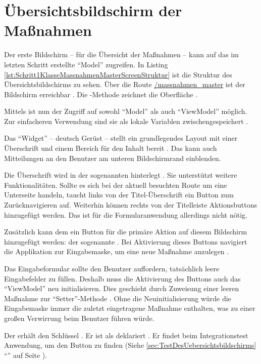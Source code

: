 \ifodd\value{page}\hbox{}\newpage\fi
\section{Übersichtsbildschirm der Maßnahmen}

Der erste Bildschirm -- für die Übersicht der Maßnahmen -- kann auf das im letzten Schritt erstellte \enquote{Model} zugreifen.
In Listing \ref{lst:Schritt1KlasseMassnahmenMasterScreenStruktur}  ist die Struktur des Übersichtsbildschirms zu sehen.
Über die Route \url{/massnahmen_master} ist der Bildschirm erreichbar . Die -Methode zeichnet die Oberfläche .

Mittels  ist nun der Zugriff auf sowohl \enquote{Model} als auch \enquote{ViewModel} möglich. Zur einfacheren Verwendung sind sie als lokale Variablen zwischengespeichert .

Das \enquote{Widget}  -- deutsch Gerüst --  stellt  ein grundlegendes Layout mit einer Überschrift und einem Bereich für den Inhalt bereit .
Das  kann auch Mitteilungen an den Benutzer am unteren Bildschirmrand einblenden.

Die Überschrift wird in der sogenannten  hinterlegt .
Sie unterstützt weitere Funktionalitäten.
Sollte es sich bei der aktuell besuchten Route  um eine Unterseite handeln, taucht links von der Titel-Überschrift ein Button zum Zurücknavigieren auf.
Weiterhin können rechts von der Titelleiste Aktionsbuttons hinzugefügt werden. Das ist für die Formularanwendung allerdings nicht nötig.

Zusätzlich kann dem  ein Button für die primäre Aktion auf diesem Bildschirm hinzugefügt werden: der sogenannte  .
Bei Aktivierung dieses Buttons navigiert die Applikation zur Eingabemaske, um eine neue Maßnahme anzulegen .

Das Eingabeformular sollte den Benutzer auffordern, tatsächlich leere Eingabefelder zu füllen.
Deshalb muss die Aktivierung des Buttons auch das \enquote{ViewModel} neu initialisieren.
Dies geschieht durch Zuweisung einer leeren Maßnahme zur \enquote{Setter}-Methode  .
Ohne die Neuinitialisierung würde die Eingabemaske immer die zuletzt eingetragene Maßnahme enthalten, was zu einer großen Verwirrung beim Benutzer führen würde.

Der  erhält den Schlüssel  .
Er ist als  deklariert .
Er findet beim Integrationstest Anwendung, um den Button zu finden (Siehe \ref{sec:TestDesUebersichtsbildschirms} \enquote{} auf Seite \pageref{sec:TestDesUebersichtsbildschirms}).

